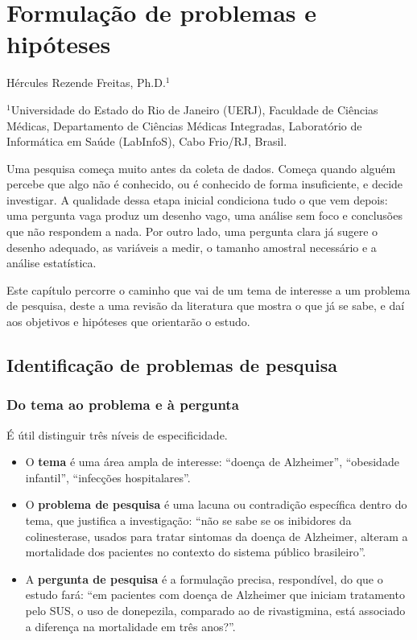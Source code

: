 \documentclass[
]{book}
\providecommand{\tightlist}{%
  \setlength{\itemsep}{0pt}\setlength{\parskip}{0pt}}
\begin{document}
\chapter{Formulação de problemas e hipóteses}\label{formulauxe7uxe3o-de-problemas-e-hipuxf3teses}

Hércules Rezende Freitas, Ph.D.\(^1\)

\(^1\)Universidade do Estado do Rio de Janeiro (UERJ), Faculdade de Ciências Médicas, Departamento de Ciências Médicas Integradas, Laboratório de Informática em Saúde (LabInfoS), Cabo Frio/RJ, Brasil.

Uma pesquisa começa muito antes da coleta de dados. Começa quando alguém percebe que algo não é conhecido, ou é conhecido de forma insuficiente, e decide investigar. A qualidade dessa etapa inicial condiciona tudo o que vem depois: uma pergunta vaga produz um desenho vago, uma análise sem foco e conclusões que não respondem a nada. Por outro lado, uma pergunta clara já sugere o desenho adequado, as variáveis a medir, o tamanho amostral necessário e a análise estatística.

Este capítulo percorre o caminho que vai de um tema de interesse a um problema de pesquisa, deste a uma revisão da literatura que mostra o que já se sabe, e daí aos objetivos e hipóteses que orientarão o estudo.

\section{Identificação de problemas de pesquisa}\label{identificauxe7uxe3o-de-problemas-de-pesquisa}

\subsection{Do tema ao problema e à pergunta}\label{do-tema-ao-problema-e-uxe0-pergunta}

É útil distinguir três níveis de especificidade.

\begin{itemize}
\tightlist
\item
  O \textbf{tema} é uma área ampla de interesse: ``doença de Alzheimer'', ``obesidade infantil'', ``infecções hospitalares''.
\item
  O \textbf{problema de pesquisa} é uma lacuna ou contradição específica dentro do tema, que justifica a investigação: ``não se sabe se os inibidores da colinesterase, usados para tratar sintomas da doença de Alzheimer, alteram a mortalidade dos pacientes no contexto do sistema público brasileiro''.
\item
  A \textbf{pergunta de pesquisa} é a formulação precisa, respondível, do que o estudo fará: ``em pacientes com doença de Alzheimer que iniciam tratamento pelo SUS, o uso de donepezila, comparado ao de rivastigmina, está associado a diferença na mortalidade em três anos?''.
\end{itemize}
\end{document}
